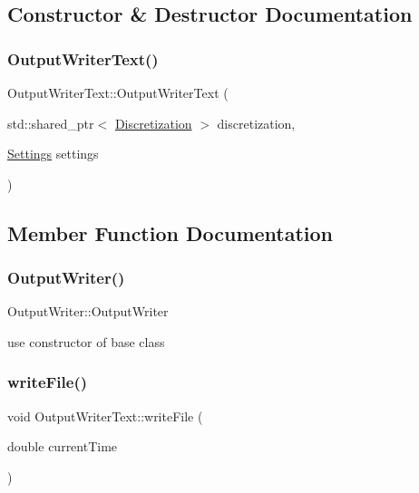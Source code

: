 \subsection{Constructor \& Destructor Documentation}
\mbox{\label{classOutputWriterText_a9ab79a49a916441fdeb11215515c9ca1}} 
\subsubsection{\texorpdfstring{OutputWriterText()}{OutputWriterText()}}
{\footnotesize\ttfamily Output\+Writer\+Text\+::\+Output\+Writer\+Text (\begin{DoxyParamCaption}\item[{std\+::shared\+\_\+ptr$<$ \mbox{\hyperlink{classDiscretization}{Discretization}} $>$}]{discretization,  }\item[{\mbox{\hyperlink{structSettings}{Settings}}}]{settings }\end{DoxyParamCaption})\hspace{0.3cm}{\ttfamily [inline]}}



\subsection{Member Function Documentation}
\mbox{\label{classOutputWriterText_a07a48bbf23f44147dce2ea3548f1d8e0}} 
\subsubsection{\texorpdfstring{OutputWriter()}{OutputWriter()}}
{\footnotesize\ttfamily Output\+Writer\+::\+Output\+Writer}



use constructor of base class 

\mbox{\label{classOutputWriterText_a25a12ea2524fc34e9acb19ef1f4c7431}} 
\subsubsection{\texorpdfstring{writeFile()}{writeFile()}}
{\footnotesize\ttfamily void Output\+Writer\+Text\+::write\+File (\begin{DoxyParamCaption}\item[{double}]{current\+Time }\end{DoxyParamCaption})\hspace{0.3cm}{\ttfamily [virtual]}}



